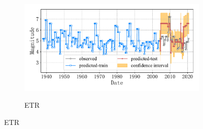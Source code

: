 \begin{figure}[!htbp]
\begin{subfigure}[b]{0.45\textwidth}
    \vspace{-1cm}
    \label{fig:seism_knn_minyear_1932_maxyear_2021_spanlat_2_spanlon_4_timewindow_72_nextmonth_12_minmag_3.0_block_5}
  \end{subfigure}
  ~
  \begin{subfigure}[b]{0.45\textwidth}
    \caption{ETR}
    \vspace{-0.2cm}
    \includegraphics[width=\textwidth]{Img/chap5_seism/block5/seism_etr_minyear_1932_maxyear_2021_spanlat_2_spanlon_4_timewindow_72_nextmonth_12_minmag_3.0_block_5.pdf}
    \vspace{-1cm}
    \label{fig:seism_etr_minyear_1932_maxyear_2021_spanlat_2_spanlon_4_timewindow_72_nextmonth_12_minmag_3.0_block_5}
  \end{subfigure}
  \label{fig:seism_minyear_1932_maxyear_2021_spanlat_2_spanlon_4_timewindow_72_nextmonth_12_minmag_3.0_block_5}
\end{figure}

